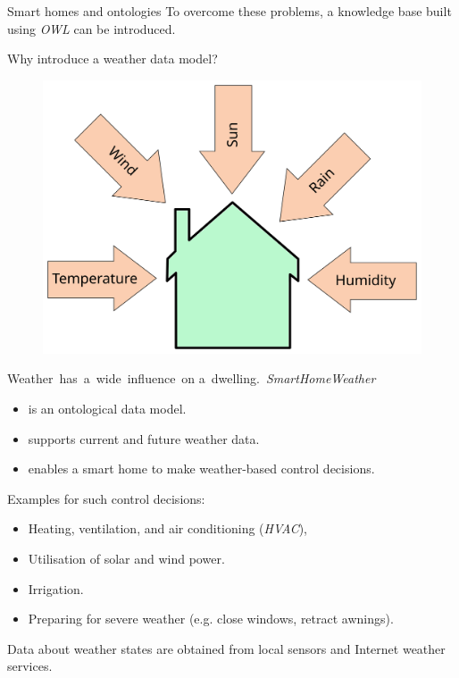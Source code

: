 \documentclass[final,hyperref={pdfpagelabels=true}]{beamer}
\begin{document}
\begin{frame}[fragile]
\begin{columns}[t]
\begin{column}{.45\textwidth}
\begin{block}{Smart homes and ontologies}
	\vspace{.5em}
	To overcome these problems, a knowledge
	base built using \emph{OWL} can be introduced.
      \end{block}

      \begin{block}{Why introduce a weather data model?}
        \begin{figure}
	  \centering
	  \includegraphics[width=.46\textwidth]{figures/inkscape/house}
	  \vspace{4cm}
	\end{figure}

	\vspace{-1.5em}
	
	\mbox{Weather has a wide influence on}
	\mbox{a dwelling. \emph{SmartHomeWeather}}
	
	\begin{itemize}
	  \item is an ontological data model.
	  \item supports current and future weather data.
	  \item enables a smart home to make weather-based control decisions.
	\end{itemize}

	\vspace{.5em}
	Examples for such control decisions:
	
	\begin{itemize}
  	  \item Heating, ventilation, and air conditioning (\emph{HVAC}),
	  \item Utilisation of solar and wind power.
	  \item Irrigation.
	  \item Preparing for severe weather (e.g. close windows, retract awnings).
	\end{itemize}

	\vspace{.5em}
	Data about weather states are obtained from local sensors and Internet weather services.
      \end{block}


\end{column}
\end{columns}
\end{frame}
\end{document}
